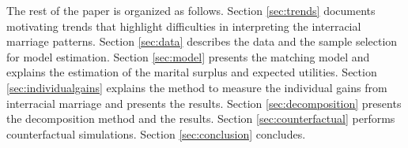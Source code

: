 The rest of the paper is organized as follows. Section \ref{sec:trends} documents motivating trends that highlight difficulties in interpreting the interracial marriage patterns. Section \ref{sec:data} describes the data and the sample selection for model estimation. Section \ref{sec:model} presents the matching model and explains the estimation of the marital surplus and expected utilities. Section \ref{sec:individualgains} explains the method to measure the individual gains from interracial marriage and presents the results. Section \ref{sec:decomposition} presents the decomposition method and the results. Section \ref{sec:counterfactual} performs counterfactual simulations. Section \ref{sec:conclusion} concludes. 
%
%
%
%
%
